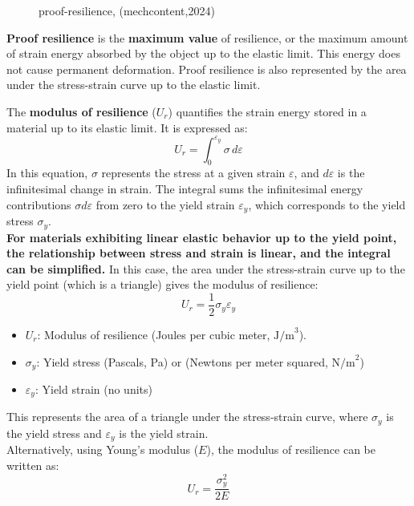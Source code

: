 \documentclass{article}
\begin{document}
\begin{center}
\begin{minipage}[t]{0.46\textwidth}
\begin{figure}[H]
    \caption{proof-resilience, (mechcontent,2024)}
    \label{fig:proof-resilience}
\end{figure}
\textbf{Proof resilience} is the \textbf{maximum value} of resilience, or the maximum amount of strain energy absorbed by the object up to the elastic limit. This energy does not cause permanent deformation. Proof resilience is also represented by the area under the stress-strain curve up to the elastic limit.
\end{minipage}

\end{center}

The \textbf{modulus of resilience} ($U_r$) quantifies the strain energy stored in a material up to its elastic limit. It is expressed as:
\begin{equation}
    U_r = \int_0^{\varepsilon_y} \sigma \, d\varepsilon
\end{equation}
In this equation, $\sigma$ represents the stress at a given strain $\varepsilon$, and $d\varepsilon$ is the infinitesimal change in strain. The integral sums the infinitesimal energy contributions $\sigma d\varepsilon$ from zero to the yield strain $\varepsilon_y$, which corresponds to the yield stress $\sigma_y$.\\[8pt]
\textbf{For materials exhibiting linear elastic behavior up to the yield point, the relationship between stress and strain is linear, and the integral can be simplified.} 
\newpage
In this case, the area under the stress-strain curve up to the yield point (which is a triangle) gives the modulus of resilience:
\begin{equation}
    U_r = \frac{1}{2} \sigma_y \varepsilon_y
\end{equation}
\begin{itemize}[itemsep=-1mm]
    \item \(U_r\): Modulus of resilience (Joules per cubic meter, \( \text{J/m}^3 \)).
    \item \( \sigma_y \): {Yield stress} (Pascals, Pa) or (Newtons per meter squared, \( \text{N/m}^2 \))
    \item \( \varepsilon_y \): {Yield strain} (no units)
\end{itemize}
This represents the area of a triangle under the stress-strain curve, where \( \sigma_y \) is the yield stress and \( \varepsilon_y \) is the yield strain.\\[8pt]
Alternatively, using Young's modulus (\( E \)), the modulus of resilience can be written as:
\begin{equation}
    U_r = \frac{\sigma_y^2}{2E}
\end{equation}
\end{document}
